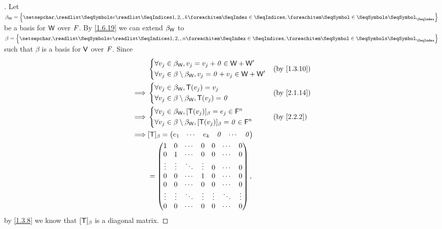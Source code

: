 \begin{proof}[]
  Let \(\beta_{\W} = \set{\seq{v}{1,2,,k}}\) be a basis for \(\mathsf{W}\) over \(\mathit{F}\).
  By \cref{1.6.19} we can extend \(\beta_{\mathsf{W}}\) to \(\beta = \set{\seq{v}{1,2,,n}}\) such that \(\beta\) is a basis for \(\mathsf{V}\) over \(\mathit{F}\).
  Since
  \begin{align*}
             & \begin{dcases}
                 \forall v_j \in \beta_{\W}, v_j = v_j + \zv \in \W + \W' \\
                 \forall v_j \in \beta \setminus \beta_{\W}, v_j = \zv + v_j \in \W + \W'
               \end{dcases}                         &  & \text{(by \cref{1.3.10})}                         \\
    \implies & \begin{dcases}
                 \forall v_j \in \beta_{\W}, \T(v_j) = v_j \\
                 \forall v_j \in \beta \setminus \beta_{\W}, \T(v_j) = \zv
               \end{dcases}                                        &  & \text{(by \cref{2.1.14})}              \\
    \implies & \begin{dcases}
                 \forall v_j \in \beta_{\W}, [\T(v_j)]_{\beta} = e_j \in \vs{F}^n \\
                 \forall v_j \in \beta \setminus \beta_{\W}, [\T(v_j)]_{\beta} = \zv \in \vs{F}^n
               \end{dcases} &  & \text{(by \cref{2.2.2})} \\
    \implies & [\T]_{\beta} = \begin{pmatrix}
                                e_1 & \cdots & e_k & \zv & \cdots & \zv
                              \end{pmatrix}                                          \\
             & = \begin{pmatrix}
                   1      & 0      & \cdots & 0      & 0      & \cdots & 0      \\
                   0      & 1      & \cdots & 0      & 0      & \cdots & 0      \\
                   \vdots & \vdots & \ddots & \vdots & 0      & \cdots & 0      \\
                   0      & 0      & \cdots & 1      & 0      & \cdots & 0      \\
                   0      & 0      & \cdots & 0      & 0      & \cdots & 0      \\
                   \vdots & \vdots & \ddots & \vdots & \vdots & \ddots & \vdots \\
                   0      & 0      & \cdots & 0      & 0      & \cdots & 0
                 \end{pmatrix},
  \end{align*}
  by \cref{1.3.8} we know that \([\mathsf{T}]_{\beta}\) is a diagonal matrix.
\end{proof}

